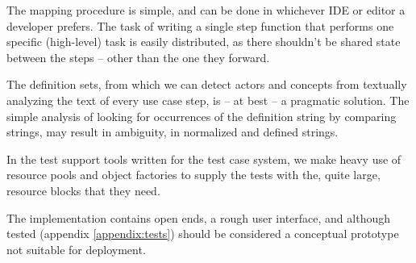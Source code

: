 \noindent The mapping procedure is simple, and can be done in whichever IDE or editor a developer prefers. The task of writing a single step function that performs one specific (high-level) task is easily distributed, as there shouldn't be shared state between the steps -- other than the one they forward.\medskip

\noindent The definition sets, from which we can detect actors and concepts from textually analyzing the text of every use case step, is -- at best -- a pragmatic solution. The simple analysis of looking for occurrences of the definition string by comparing strings, may result in ambiguity, in normalized and defined strings.\medskip

\noindent In the test support tools written for the test case system, we make heavy use of resource pools and object factories to supply the tests with the, quite large, resource blocks that they need.\medskip

\noindent The implementation contains open ends, a rough user interface, and although tested (appendix \ref{appendix:tests}) should be considered a conceptual prototype not suitable for deployment.
